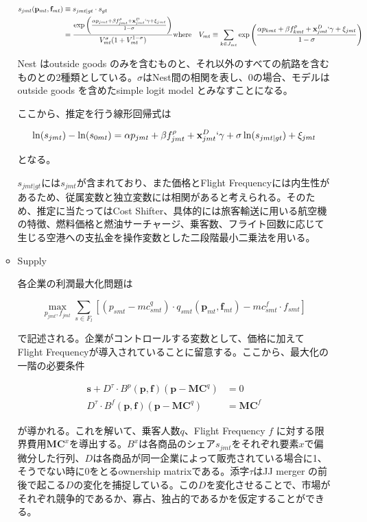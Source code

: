 \documentclass{jsarticle}
\begin{document}
\begin{enumerate}
\begin{itemize}
\begin{align*}
s_{jmt}(\mathbf{p}_{mt},\mathbf{f}_{mt}) & \equiv s_{jmt|gt} \cdot s_{gt} \\
 & = \dfrac{\exp \left( \frac{\alpha p_{jmt} +\beta f_{jmt}^{\rho} +\mathbf{x}^{D}_{jmt} ` \gamma + \xi_{jmt}}{1-\sigma} \right)}{V_{mt}^{\sigma}(1+V_{mt}^{1-\sigma})}
\text{where} & V_{mt} \equiv \sum _{k \in J_{mt}} \exp \left( \dfrac{\alpha p_{kmt} + \beta f_{kmt}^{\rho} +\mathbf{x}^{D}_{jmt} ` \gamma + \xi_{jmt}}{1 - \sigma } \right)
\end{align*}

Nest はoutside goods のみを含むものと、それ以外のすべての航路を含むものとの2種類としている。$\sigma$はNest間の相関を表し、0の場合、モデルはoutside goods を含めたsimple logit model とみなすことになる。

ここから、推定を行う線形回帰式は

\[\ln (s_{jmt}) - \ln (s_{0mt}) = \alpha p_{jmt} + \beta f_{jmt}^{\rho} + \mathbf{x}_{jmt}^D ` \gamma
 + \sigma \ln (s_{jmt | gt}) + \xi_{jmt} \]
 
 となる。
 
 $s_{jmt|gt}$には$s_{jmt}$が含まれており、また価格とFlight Frequencyには内生性があるため、従属変数と独立変数には相関があると考えられる。そのため、推定に当たってはCost Shifter、具体的には旅客輸送に用いる航空機の特徴、燃料価格と燃油サーチャージ、乗客数、フライト回数に応じて生じる空港への支払金を操作変数とした二段階最小二乗法を用いる。

\item Supply

各企業の利潤最大化問題は

\[ \max_{p_{jmt},f_{jmt}} \sum _{s \in F_l} 
[(p_{smt} - mc_{smt}^q ) \cdot q_{smt} 
( \mathbf{p}_{mt}, \mathbf{f}_{mt}) - mc_{smt}^f \cdot f_{smt}] \]

で記述される。企業がコントロールする変数として、価格に加えて Flight Frequencyが導入されていることに留意する。ここから、最大化の一階の必要条件

 \begin{align*}
 \mathbf{s} + D^{\tau} \cdot B^p (\mathbf{p},\mathbf{f})(\mathbf{p} - \mathbf{MC}^q) &=0 \\
 D^{\tau} \cdot B^f (\mathbf{p},\mathbf{f})(\mathbf{p}-\mathbf{MC}^q) &= \mathbf{MC}^f
 \end{align*}

が導かれる。これを解いて、乗客人数$q$、Flight Frequency $f$ に対する限界費用$\mathbf{MC}^x$を導出する。$B^x$は各商品のシェア$s_{jmt}$をそれぞれ要素$x$で偏微分した行列、$D$は各商品が同一企業によって販売されている場合に1、そうでない時に0をとるownership matrixである。添字$\tau$はJJ merger の前後で起こる$D$の変化を捕捉している。この$D$を変化させることで、市場がそれぞれ競争的であるか、寡占、独占的であるかを仮定することができる。


\end{itemize}
\end{enumerate}
\end{document}
